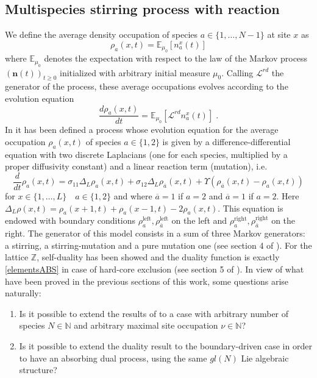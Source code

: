 \documentclass[10pt]{article}
\numberwithin{equation}{section}
\numberwithin{equation}{subsection}
\newcommand{\dt}{\;.}
\begin{document}
\subsection{Multispecies stirring process with reaction} \label{Subsection-RD}
We define the average density occupation of species $a\in\{1,\ldots,N-1\}$ at site $x$ as
\begin{equation}
	\rho_{a}(x,t)=\mathbb{E}_{\mu_{0}}\left[n_{a}^{x}(t)\right]
\end{equation}
where $\mathbb{E}_{\mu_{0}}$ denotes the expectation with respect to the law of the Markov process $(\bm{n}(t))_{t\geq 0}$ initialized with arbitrary initial measure $\mu_{0}$. Calling
$\mathcal{L}^{rd}$ the generator of the process, these average occupations evolves according to the evolution equation
\begin{equation}\label{EE-density}
	\frac{d \rho_{a}(x,t)}{dt}=\mathbb{E}_{\mu_{0}}\left[\mathcal{L}^{rd}n_{a}^{x}(t)\right]\dt
\end{equation} 
In \cite{casini2022uphill} it has been defined a process whose evolution equation for the average occupation $\rho_{a}(x,t)$ of species $a\in \{1,2\}$ is given by a difference-differential equation with two discrete Laplacians (one for each species, multiplied by a proper diffusivity constant) and a linear reaction term (mutation), i.e.
\begin{equation}\label{2SpeciesRD}
	\frac{d}{dt} \rho_{a}(x,t)=\sigma_{11}\Delta_{L}\rho_{a}(x,t)+\sigma_{12}\Delta_{L}\rho_{\overline{a}}(x,t)+\Upsilon\left(\rho_{\overline{a}}(x,t)-\rho_{a}(x,t)\right)
\end{equation} 
for $ x\in\{1,\ldots,L\}\quad a\in\{1,2\}$  and where $\overline{a}=1$ if $a=2$ and $\overline{a}=1$ if $a=2$. Here $\Delta_{L}\rho(x,t)=\rho_{a}(x+1,t)+\rho_{a}(x-1,t)-2\rho_{a}(x,t)$.
This equation is endowed with boundary conditions $\rho_{a}^{\text{left}},\rho_{\overline{a}}^{\text{left}}$ on the left and $\rho_{a}^{\text{right}},\rho_{\overline{a}}^{\text{right}}$ on the right. 
The generator of this model consists in a sum of three Markov generators: a stirring, a stirring-mutation and a pure mutation one (see section 4 of \cite{casini2022uphill}). For the lattice $\mathbb{Z}$, self-duality has been showed and the duality function is exactly \eqref{elementsABS} in case of hard-core exclusion (see section 5 of \cite{casini2022uphill}). In view of what have been proved in the previous sections of this work, some questions arise naturally:
\begin{enumerate}
		\item Is it possible to extend the results of \cite{casini2022uphill} to a case with arbitrary number of species $N\in \mathbb{N}$ and arbitrary maximal site occupation $\nu\in \mathbb{N}$?
			\item Is it possible to extend the duality result to the boundary-driven case in order to have an absorbing dual process, using the same ${gl}(N)$ Lie algebraic structure?
\end{enumerate}
\end{document}
